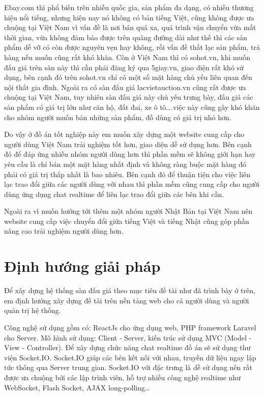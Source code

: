 \documentclass[../DoAn.tex]{subfiles}
\begin{document}
Ebay.com thì phổ biến trên nhiều quốc gia, sản phẩm đa dạng, có nhiều thương hiệu nổi tiếng, nhưng hiện nay nó không có bản tiếng Việt, cũng không được ưa chuộng tại Việt Nam vì vấn đề là nơi bán quá xa, quá trình vận chuyển vừa mất thời gian, vừa không đảm bảo được trên quãng đường dài như thế thì các sản phẩm dễ vỡ có còn được nguyên vẹn hay không, rồi vấn đề thất lạc sản phẩm, trả hàng nếu muốn cũng rất khó khăn. Còn ở Việt Nam thì có sohot.vn, khi muốn đấu giá trên sàn này thì cần phải đăng ký qua 5giay.vn, giao diện rất khó sử dụng, bên cạnh đó trên sohot.vn chỉ có một số mặt hàng chủ yếu liên quan đến nội thất gia đình. Ngoài ra có sàn đấu giá lacvietauction.vn cũng rất được ưa chuộng tại Việt Nam, tuy nhiên sàn đấu giá này chủ yếu trưng bày, đấu giá  các sản phẩm có giá trị lớn như căn hộ, đất đai, xe ô tô….việc này cũng gây khó khăn cho nhóm người muốn bán những sản phẩm, đồ dùng có giá trị nhỏ hơn.

Do vậy ở đồ án tốt nghiệp này em muốn xây dựng một website cung cấp cho người dùng Việt Nam trải nghiệm tốt hơn, giao diện dễ sử dụng hơn. Bên cạnh đó để đáp ứng nhiều nhóm người dùng hơn thì phần mềm sẽ không giới hạn hay yêu cầu là chỉ bán một mặt hàng nhất định và không ràng buộc mặt hàng đó phải có giá trị thấp nhất là bao nhiêu. Bên cạnh đó để thuận tiện cho việc liên lạc trao đổi giữa các người dùng với nhau thì phần mềm cũng cung cấp cho người dùng ứng dụng chat realtime để liên lạc trao đổi giữa các bên khi cần. 

Ngoài ra vì muốn hướng tới thêm một nhóm người Nhật Bản tại Việt Nam nên website cung cấp việc chuyển đổi giữa tiếng Việt và tiếng Nhật cũng góp phần nâng cao trải nghiệm người dùng hơn.

\section{Định hướng giải pháp}
\label{section:1.3}
Để xây dựng hệ thống sàn đấu giá theo mục tiêu đề tài như đã trình bày ở trên, em định hướng xây dựng đề tài trên nền tảng web cho cả người dùng và người quản trị hệ thống. 

Công nghệ sử dụng gồm có: ReactJs cho ứng dụng web, PHP framework Laravel cho Server. Mô hình sử dụng: Client - Server, kiến trúc sử dụng MVC (Model - View - Controller). Để xây dựng chức năng chat realtime đồ án sẽ sử dụng thư viện Socket.IO. Socket.IO giúp các bên kết nối với nhau, truyền dữ liệu ngay lập tức thông qua Server trung gian. Socket.IO với đặc trưng là dễ sử dụng nên rất được ưa chuộng bởi các lập trình viên, hỗ trợ  nhiều công nghệ realtime như WebSocket, Flash Socket, AJAX long-polling…
\end{document}

